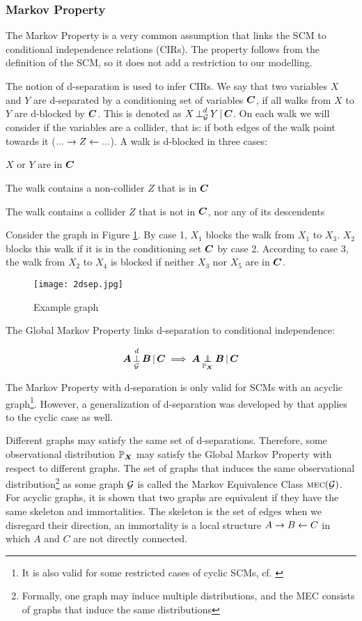 \subsubsection{Markov Property}
The Markov Property is a very common assumption that links the SCM to conditional independence relations (CIRs). The property follows from the definition of the SCM, so it does not add a restriction to our modelling. 

The notion of d-separation is used to infer CIRs. We say that two variables $X$ and $Y$ are d-separated by a conditioning set of variables $\B{C}$, if all walks from $X$ to $Y$ are d-blocked by $\B{C}$. This is denoted as $\dsep{X}{Y}{\B{C}}{\C{G}}$. On each walk we will consider if the variables are a collider, that is: if both edges of the walk point towards it ($...\to Z \ot ...$). A walk is d-blocked in three cases:

\begin{compactenum}
    \item $X$ or $Y$ are in $\B{C}$
    \item The walk contains a non-collider $Z$ that is in $\B{C}$
    \item The walk contains a collider $Z$ that is not in $\B{C}$, nor any of its descendents
\end{compactenum}

Consider the graph in Figure \ref{fig:2:dsep}. By case 1, $X_1$ blocks the walk from $X_1$ to $X_3$. $X_2$ blocks this walk if it is in the conditioning set $\B{C}$ by case 2. According to case 3, the walk from $X_2$ to $X_4$ is blocked if neither $X_3$ nor $X_5$ are in $\B{C}$.

\begin{figure}[h]
    \centering
    \texttt{[image: 2dsep.jpg]}
    \caption{Example graph}
    \label{fig:2:dsep}
\end{figure}

The Global Markov Property links d-separation to conditional independence:

$$\dsep{\B{A}}{\B{B}}{\B{C}}{\C{G}} \implies \indep{\B{A}}{\B{B}}{\B{C}}{\Prb_{\B{X}}}$$

The Markov Property with d-separation is only valid for SCMs with an acyclic graph\footnote{It is also valid for some restricted cases of cyclic SCMs, cf. \citet{forre2017markov}}. However, a generalization of d-separation was developed by \citet{forre2017markov} that applies to the cyclic case as well.

Different graphs may satisfy the same set of d-separations. Therefore, some observational distribution $\Prb_{\B{X}}$ may satisfy the Global Markov Property with respect to different graphs. The set of graphs that induces the same observational distribution\footnote{Formally, one graph may induce multiple distributions, and the MEC consists of graphs that induce the same distributions} as some graph $\C{G}$ is called the Markov Equivalence Class $\mec(\C{G})$. For acyclic graphs, it is shown that two graphs are equivalent if they have the same skeleton and immortalities. The skeleton is the set of edges when we disregard their direction, an immortality is a local structure $A\to B \ot C$ in which $A$ and $C$ are not directly connected.

